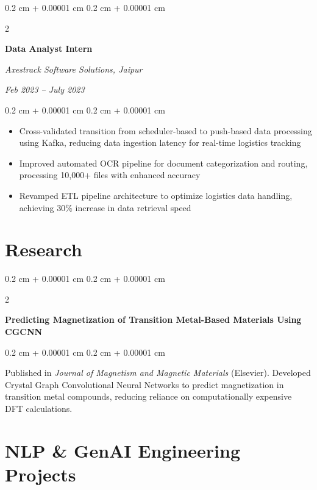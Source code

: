 \documentclass[10pt, letterpaper]{article}
\newenvironment{highlights}{
    \begin{itemize}[
        topsep=0.10 cm,
        parsep=0.10 cm,
        partopsep=0pt,
        itemsep=0pt,
        leftmargin=0.4 cm + 10pt
    ]
}{
    \end{itemize}
}
\newenvironment{onecolentry}{
    \begin{adjustwidth}{
        0.2 cm + 0.00001 cm
    }{
        0.2 cm + 0.00001 cm
    }
}{
    \end{adjustwidth}
}
\newenvironment{twocolentry}[2][]{
    \onecolentry
    \def\secondColumn{#2}
    \setcolumnwidth{\fill, 4.5 cm}
    \begin{paracol}{2}
}{
    \switchcolumn \raggedleft \secondColumn
    \end{paracol}
    \endonecolentry
}
\let\hrefWithoutArrow\href
\renewcommand{\href}[2]{\hrefWithoutArrow{#1}{\ifthenelse{\equal{#2}{}}{ }{#2 }\raisebox{.15ex}{\footnotesize \faExternalLink*}}}
\begin{document}
        \vspace{0.2 cm}

        \begin{twocolentry}{\textit{Feb 2023 – July 2023}}
            \textbf{Data Analyst Intern}
            
            \textit{Axestrack Software Solutions, Jaipur}
        \end{twocolentry}

        \vspace{0.10 cm}
        \begin{onecolentry}
            \begin{highlights}
                \item Cross-validated transition from scheduler-based to push-based data processing using Kafka, reducing data ingestion latency for real-time logistics tracking
                \item Improved automated OCR pipeline for document categorization and routing, processing 10,000+ files with enhanced accuracy
                \item Revamped ETL pipeline architecture to optimize logistics data handling, achieving 30\% increase in data retrieval speed
            \end{highlights}
        \end{onecolentry}

    \section{Research}

        \begin{twocolentry}{\textit{\href{https://www.sciencedirect.com/science/article/abs/pii/S0304885325007735}{Sep 2025}}}
            \textbf{Predicting Magnetization of Transition Metal-Based Materials Using CGCNN}
        \end{twocolentry}
        
        \vspace{0.05 cm}
        \begin{onecolentry}
            Published in \textit{Journal of Magnetism and Magnetic Materials} (Elsevier). Developed Crystal Graph Convolutional Neural Networks to predict magnetization in transition metal compounds, reducing reliance on computationally expensive DFT calculations.
        \end{onecolentry}
\vspace{0.3 cm}
    \section{NLP \& GenAI Engineering Projects}
\end{document}
